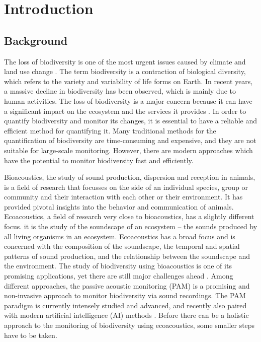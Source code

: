 

\section{Introduction}
\label{section1}

\subsection{Background}%

The loss of biodiversity is one of the most urgent issues caused by climate and land use change \autocite{cardinaleBiodiversityLossIts2012}. 
The term biodiversity is a contraction of biological diversity, which refers to the variety and variability of life forms on Earth.
In recent years, a massive decline in biodiversity has been observed, which is mainly due to human activities. 
The loss of biodiversity is a major concern because it can have a significant impact on the ecosystem and the services it provides \autocite{brondizioGlobalAssessmentReport2019}. 
In order to quantify biodiversity and monitor its changes, it is essential to have a reliable and efficient method for quantifying it.
Many traditional methods for the quantification of biodiversity are time-consuming and expensive, and they are not suitable for large-scale monitoring.
However, there are modern approaches which have the potential to monitor biodiversity fast and efficiently.

Bioacoustics, the study of sound production, dispersion and reception in animals, is a
field of research that focusses on the side of an individual species, group or community
and their interaction with each other or their environment. 
It has provided pivotal insights into the behavior and communication of animals.
Ecoacoustics, a field of research very close to bioacoustics, has a slightly different focus.
it is the study of the soundscape of an ecosystem -- the sounds produced by all living organisms in an ecosystem.
Ecoacoustics has a broad focus and is concerned with the composition of the soundscape, the temporal and spatial patterns of sound production, 
and the relationship between the soundscape and the environment. The study of biodiversity using bioacoustics
is one of its promising applications, yet there are still major challenges ahead \autocite{scarpelliMultiIndexEcoacousticsAnalysis2021}.
Among different approaches, the passive acoustic monitoring (PAM) is a promising and non-invasive approach to monitor biodiversity via sound recordings.
The PAM paradigm is currently intensely studied and advanced, and recently also paired with modern artificial intelligence (AI) methods \autocite{dengHarnessingPowerSound2023}.
Before there can be a holistic approach to the monitoring of biodiversity using ecoacoustics, some smaller steps have to be taken.

